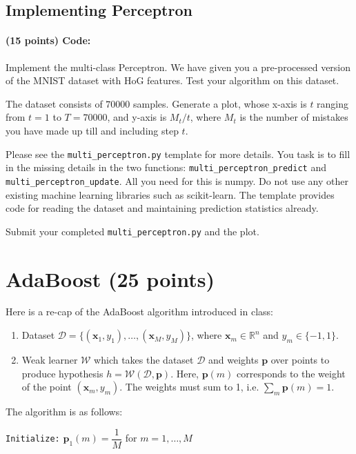 \documentclass{article}
\begin{document}
\subsection{Implementing Perceptron}
\paragraph{(15 points) Code:} Implement the multi-class Perceptron. We have given you a pre-processed version of the MNIST dataset with HoG features. Test your algorithm on this dataset. 

The dataset consists of $70000$ samples. Generate a plot, whose x-axis is $t$ ranging from $t=1$ to $T=70000$, and y-axis is $M_t/t$, where $M_t$ is the number of mistakes you have made up till and including step $t$. 

Please see the \texttt{multi\_perceptron.py} template for more details. You task is to fill in the missing details in the two functions: \texttt{multi\_perceptron\_predict} and \texttt{multi\_perceptron\_update}. All you need for this is numpy. Do not use any other existing machine learning libraries such as scikit-learn. 
The template provides code for reading the dataset and maintaining prediction statistics already. 

Submit your completed \texttt{multi\_perceptron.py} and the plot.

\section{AdaBoost (25 points)}
Here is a re-cap of the AdaBoost algorithm introduced in class:

\begin{enumerate}
    \item Dataset $\mathcal{D} = \{(\mathbf{x}_1, y_1), \hdots, (\mathbf{x}_M,y_M)\}$, where $\mathbf{x}_m \in \mathbb{R}^n$ and $y_m \in \{-1, 1\}$.
    \item Weak learner $\mathcal{W}$ which takes the dataset $\mathcal{D}$ and weights $\mathbf{p}$ over points to produce hypothesis $h = \mathcal{W}(\mathcal{D}, \mathbf{p})$.
    Here, $\mathbf{p}(m)$ corresponds to the weight of the point $(\mathbf{x}_m, y_m)$. The weights must sum to 1, i.e. $\sum_m \mathbf{p}(m) = 1$. 
\end{enumerate}

\noindent The algorithm is as follows: 


\vspace{2mm}
\texttt{Initialize:} $\mathbf{p}_1(m) = \dfrac{1}{M}$ for $m = 1, \hdots, M$
\end{document}
